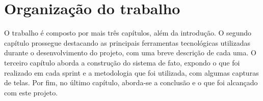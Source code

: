 \section{Organização do trabalho}

O trabalho é composto por mais três capítulos, além da introdução. O segundo capítulo prossegue destacando as principais ferramentas tecnológicas utilizadas durante o desenvolvimento do projeto, com uma breve descrição de cada uma. O terceiro capítulo aborda a construção do sistema de fato, expondo o que foi realizado em cada sprint e a metodologia que foi utilizada, com algumas capturas de telas. Por fim, no último capítulo, aborda-se a conclusão e o que foi alcançado com este projeto.
